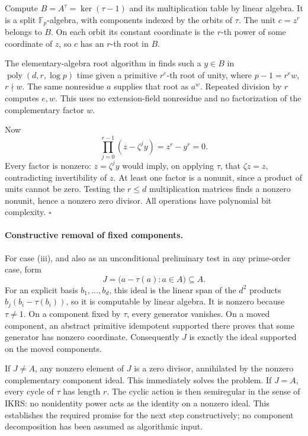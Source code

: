 \documentclass[11pt,a4paper]{article}
\begin{document}
Compute \(B=A^\tau=\ker(\tau-1)\) and its multiplication table by
linear algebra.
It is a split \(\mathbb F_p\)-algebra, with components indexed by
the orbits of \(\tau\).
The unit \(c=z^r\) belongs to \(B\).
On each orbit its constant coordinate is the \(r\)-th power of
some coordinate of \(z\), so \(c\) has an \(r\)-th root in \(B\).

The elementary-algebra root algorithm in
\cite[\S2.4, Lemma~2.6, author pp.7--9]{CXNGao01}
finds such a \(y\in B\) in
\(\operatorname{poly}(d,r,\log p)\) time given a primitive
\(r^e\)-th root of unity, where \(p-1=r^e w\), \(r\nmid w\).
The same nonresidue \(a\) supplies that root as \(a^w\).
Repeated division by \(r\) computes \(e,w\).
This uses no extension-field nonresidue and no factorization of
the complementary factor \(w\).

Now
\[
 \prod_{j=0}^{r-1}(z-\zeta^j y)=z^r-y^r=0.
\]
Every factor is nonzero: \(z=\zeta^j y\) would imply, on applying
\(\tau\), that \(\zeta z=z\), contradicting invertibility of \(z\).
At least one factor is a nonunit, since a product of units cannot
be zero.
Testing the \(r\leq d\) multiplication matrices finds a nonzero
nonunit, hence a nonzero zero divisor.
All operations have polynomial bit complexity.
\hfill\(\square\)

\paragraph{Constructive removal of fixed components.}
For case (iii), and also as an unconditional preliminary test in
any prime-order case, form
\[
 J=\bigl(a-\tau(a):a\in A\bigr)\subseteq A.
\]
For an explicit basis \(b_1,\ldots,b_d\), this ideal is the linear
span of the \(d^2\) products
\(b_j(b_i-\tau(b_i))\), so it is computable by linear algebra.
It is nonzero because \(\tau\ne1\).
On a component fixed by \(\tau\), every generator vanishes.
On a moved component, an abstract primitive idempotent supported
there proves that some generator has nonzero coordinate.
Consequently \(J\) is exactly the ideal supported on the moved
components.

If \(J\ne A\), any nonzero element of \(J\) is a zero divisor,
annihilated by the nonzero complementary component ideal.
This immediately solves the problem.
If \(J=A\), every cycle of \(\tau\) has length \(r\).
The cyclic action is then semiregular in the sense of IKRS:
no nonidentity power acts as the identity on a nonzero ideal.
This establishes the required promise for the next step
constructively; no component decomposition has been assumed as
algorithmic input.
\end{document}
